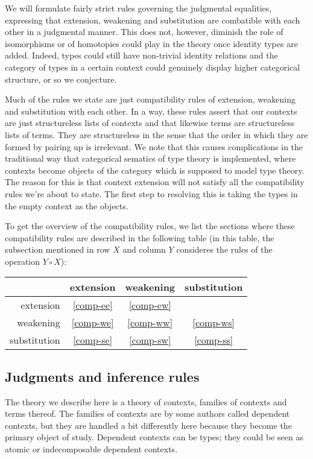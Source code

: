 We will formulate fairly strict rules governing the judgmental equalities,
expressing that extension, weakening and substitution are combatible with
each other in a judgmental manner. This does not, however, diminish the role
of isomorphisms or of homotopies could play in the theory once identity types
are added. Indeed, types could still have non-trivial identity relations and
the category of types in a certain context could genuinely display higher
categorical structure, or so we conjecture.

Much of the rules we state are just compatibility rules of extension, weakening
and substitution with each other. In a way, these rules assert that our contexts
are just structureless lists of contexts and that likewise terms are structureless
lists of terms. They are structureless in the sense that the order in which
they are formed by pairing up is irrelevant. We note that this causes complications
in the traditional way that categorical sematics of type theory is implemented,
where contexts become objects of the category which is supposed to model type
theory. The reason for this is that context extension will not satisfy all the
compatibility rules we're about to state. The first step to resolving this is taking
the types in the empty context as the objects. 

To get the overview of the compatibility rules, we list the sections
where these compatibility rules are described in the following table (in this
table, the
subsection mentioned in row $X$ and column $Y$ consideres the rules of the
operation $Y\circ X$):
\begin{center}
\begin{tabular}{r|ccc}
& extension & weakening & substitution\\
\hline
extension & \autoref{comp-ee} & \autoref{comp-ew} & \\
weakening & \autoref{comp-we} & \autoref{comp-ww} & \autoref{comp-ws}\\
substitution & \autoref{comp-se} & \autoref{comp-sw} & \autoref{comp-ss}
\end{tabular}
\end{center}

\subsection{Judgments and inference rules}\label{judgments}
The theory we describe here is a theory of contexts, families of
contexts and terms thereof. The families of contexts are by some authors called
dependent contexts, but they are handled a bit differently here because they
become the primary object of study. Dependent contexts can be types; they could
be seen as atomic or indecomposable dependent contexts.

